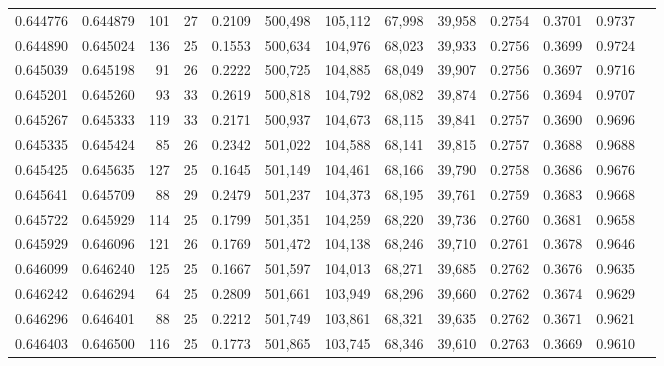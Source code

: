 \begin{tabular}{rrrrrrrrrrrrr}
0.644776 & 0.644879 &   101 &  27 &                                     0.2109 & 500,498 & 105,112 &  67,998 &  39,958 & 0.2754 & 0.3701 & 0.9737 \\
0.644890 & 0.645024 &   136 &  25 &                                     0.1553 & 500,634 & 104,976 &  68,023 &  39,933 & 0.2756 & 0.3699 & 0.9724 \\
0.645039 & 0.645198 &    91 &  26 &                                     0.2222 & 500,725 & 104,885 &  68,049 &  39,907 & 0.2756 & 0.3697 & 0.9716 \\
0.645201 & 0.645260 &    93 &  33 &                                     0.2619 & 500,818 & 104,792 &  68,082 &  39,874 & 0.2756 & 0.3694 & 0.9707 \\
0.645267 & 0.645333 &   119 &  33 &                                     0.2171 & 500,937 & 104,673 &  68,115 &  39,841 & 0.2757 & 0.3690 & 0.9696 \\
0.645335 & 0.645424 &    85 &  26 &                                     0.2342 & 501,022 & 104,588 &  68,141 &  39,815 & 0.2757 & 0.3688 & 0.9688 \\
0.645425 & 0.645635 &   127 &  25 &                                     0.1645 & 501,149 & 104,461 &  68,166 &  39,790 & 0.2758 & 0.3686 & 0.9676 \\
0.645641 & 0.645709 &    88 &  29 &                                     0.2479 & 501,237 & 104,373 &  68,195 &  39,761 & 0.2759 & 0.3683 & 0.9668 \\
0.645722 & 0.645929 &   114 &  25 &                                     0.1799 & 501,351 & 104,259 &  68,220 &  39,736 & 0.2760 & 0.3681 & 0.9658 \\
0.645929 & 0.646096 &   121 &  26 &                                     0.1769 & 501,472 & 104,138 &  68,246 &  39,710 & 0.2761 & 0.3678 & 0.9646 \\
0.646099 & 0.646240 &   125 &  25 &                                     0.1667 & 501,597 & 104,013 &  68,271 &  39,685 & 0.2762 & 0.3676 & 0.9635 \\
0.646242 & 0.646294 &    64 &  25 &                                     0.2809 & 501,661 & 103,949 &  68,296 &  39,660 & 0.2762 & 0.3674 & 0.9629 \\
0.646296 & 0.646401 &    88 &  25 &                                     0.2212 & 501,749 & 103,861 &  68,321 &  39,635 & 0.2762 & 0.3671 & 0.9621 \\
0.646403 & 0.646500 &   116 &  25 &                                     0.1773 & 501,865 & 103,745 &  68,346 &  39,610 & 0.2763 & 0.3669 & 0.9610 \\

\end{tabular}

